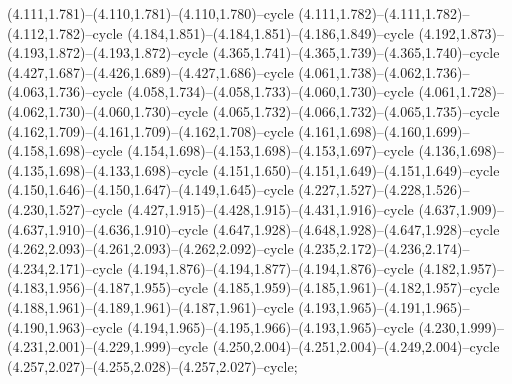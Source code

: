 (4.111,1.781)--(4.110,1.781)--(4.110,1.780)--cycle (4.111,1.782)--(4.111,1.782)--(4.112,1.782)--cycle (4.184,1.851)--(4.184,1.851)--(4.186,1.849)--cycle (4.192,1.873)--(4.193,1.872)--(4.193,1.872)--cycle (4.365,1.741)--(4.365,1.739)--(4.365,1.740)--cycle (4.427,1.687)--(4.426,1.689)--(4.427,1.686)--cycle (4.061,1.738)--(4.062,1.736)--(4.063,1.736)--cycle (4.058,1.734)--(4.058,1.733)--(4.060,1.730)--cycle (4.061,1.728)--(4.062,1.730)--(4.060,1.730)--cycle (4.065,1.732)--(4.066,1.732)--(4.065,1.735)--cycle (4.162,1.709)--(4.161,1.709)--(4.162,1.708)--cycle (4.161,1.698)--(4.160,1.699)--(4.158,1.698)--cycle (4.154,1.698)--(4.153,1.698)--(4.153,1.697)--cycle (4.136,1.698)--(4.135,1.698)--(4.133,1.698)--cycle (4.151,1.650)--(4.151,1.649)--(4.151,1.649)--cycle (4.150,1.646)--(4.150,1.647)--(4.149,1.645)--cycle (4.227,1.527)--(4.228,1.526)--(4.230,1.527)--cycle (4.427,1.915)--(4.428,1.915)--(4.431,1.916)--cycle (4.637,1.909)--(4.637,1.910)--(4.636,1.910)--cycle (4.647,1.928)--(4.648,1.928)--(4.647,1.928)--cycle (4.262,2.093)--(4.261,2.093)--(4.262,2.092)--cycle (4.235,2.172)--(4.236,2.174)--(4.234,2.171)--cycle (4.194,1.876)--(4.194,1.877)--(4.194,1.876)--cycle (4.182,1.957)--(4.183,1.956)--(4.187,1.955)--cycle (4.185,1.959)--(4.185,1.961)--(4.182,1.957)--cycle (4.188,1.961)--(4.189,1.961)--(4.187,1.961)--cycle (4.193,1.965)--(4.191,1.965)--(4.190,1.963)--cycle (4.194,1.965)--(4.195,1.966)--(4.193,1.965)--cycle (4.230,1.999)--(4.231,2.001)--(4.229,1.999)--cycle (4.250,2.004)--(4.251,2.004)--(4.249,2.004)--cycle (4.257,2.027)--(4.255,2.028)--(4.257,2.027)--cycle;
